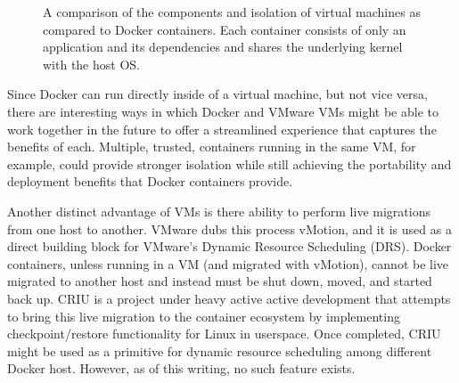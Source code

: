 \documentclass[\myfontsize, letterpaper]{article}
\begin{document}
\begin{figure}[h]
\centering
{}
\quad
\quad
{}
\caption{A comparison of the components and isolation of virtual machines as compared to Docker containers. Each container consists of only an application and its dependencies and shares the underlying kernel with the host OS.}
\label{fig:test}
\end{figure}

Since Docker can run directly inside of a virtual machine, but not vice versa, there are interesting ways in which Docker and VMware VMs might be able to work together in the future to offer a streamlined experience that captures the benefits of each. Multiple, trusted, containers running in the same VM, for example, could provide stronger isolation while still achieving the portability and deployment benefits that Docker containers provide.

Another distinct advantage of VMs is there ability to perform live migrations from one host to another. VMware dubs this process vMotion\cite{vmotion}, and it is used as a direct building block for VMware's Dynamic Resource Scheduling (DRS)\cite{DRS}. Docker containers, unless running in a VM (and migrated with vMotion), cannot be live migrated to another host and instead must be shut down, moved, and started back up. CRIU\cite{CRIU} is a project under heavy active active development that attempts to bring this live migration to the container ecosystem by implementing checkpoint/restore functionality for Linux in userspace. Once completed, CRIU might be used as a primitive for dynamic resource scheduling among different Docker host. However, as of this writing, no such feature exists.
\end{document}
